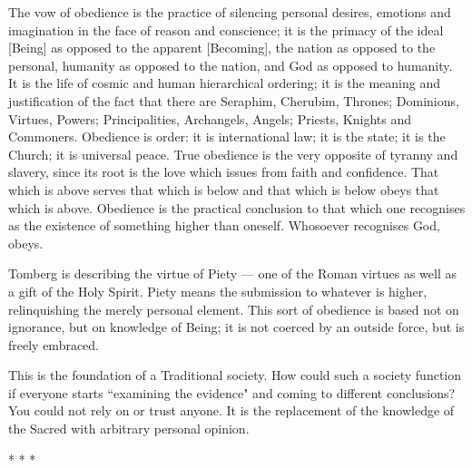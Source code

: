 \begin{quotex}
The vow of obedience is the practice of silencing personal desires, emotions and imagination in the face of reason and conscience; it is the primacy of the ideal [Being] as opposed to the apparent [Becoming], the nation as opposed to the personal, humanity as opposed to the nation, and God as opposed to humanity. It is the life of cosmic and human hierarchical ordering; it is the meaning and justification of the fact that there are Seraphim, Cherubim, Thrones; Dominions, Virtues, Powers; Principalities, Archangels, Angels; Priests, Knights and Commoners. Obedience is order: it is international law; it is the state; it is the Church; it is universal peace. True obedience is the very opposite of tyranny and slavery, since its root is the love which issues from faith and confidence. That which is above serves that which is below and that which is below obeys that which is above. Obedience is the practical conclusion to that which one recognises as the existence of something higher than oneself. Whosoever recognises God, obeys. 

\end{quotex}
Tomberg is describing the virtue of Piety — one of the Roman virtues as well as a gift of the Holy Spirit. Piety means the submission to whatever is higher, relinquishing the merely personal element. This sort of obedience is based not on ignorance, but on knowledge of Being; it is not coerced by an outside force, but is freely embraced.

This is the foundation of a Traditional society. How could such a society function if everyone starts ``examining the evidence" and coming to different conclusions? You could not rely on or trust anyone. It is the replacement of the knowledge of the Sacred with arbitrary personal opinion.




\begin{center}* * *\end{center}

